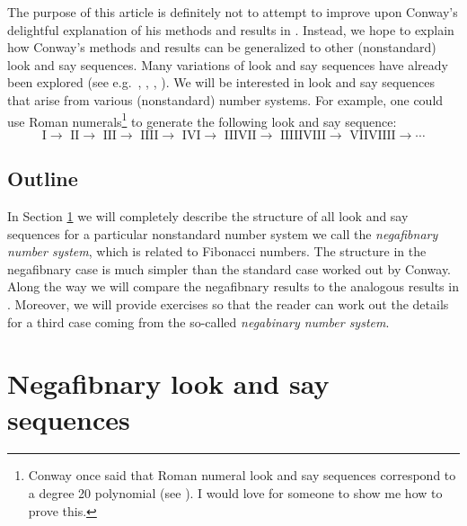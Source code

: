 \documentclass[reqno]{amsart}
\theoremstyle{definition}
\begin{document}
The purpose of this article is definitely not to attempt to improve upon Conway's delightful explanation of his methods and results in \cite{Conway}. Instead, we hope to explain how Conway's methods and results can be generalized to other (nonstandard) look and say sequences. Many variations of look and say sequences have already been explored (see e.g.~\cite{brier2020stuttering,brier2020lookandsay}, \cite{Matin}, \cite{Morrill}, \cite{SauerbergShu}). We will be interested in look and say sequences that arise from various (nonstandard) number systems. For example, one could use Roman numerals\footnote{Conway once said that Roman numeral look and say sequences correspond to a degree 20 polynomial (see \cite{Conway-numberphile}). I would love for someone to show me how to prove this.} 
to generate the following look and say sequence:
\begin{equation*}
    \text{I$\to$ II$\to$ III$\to$ IIII$\to$ IVI$\to$ IIIVII$\to$ IIIIIVIII$\to$ VIIVIIII}\to\cdots
\end{equation*}

\subsection{Outline} In Section \ref{section::negafibnary look and say} we will completely describe the structure of all look and say sequences for a particular nonstandard number system we call the \emph{negafibnary number system}, which is related to Fibonacci numbers. The structure in the negafibnary case is much simpler than the standard case worked out by Conway. Along the way we will compare the negafibnary results to the analogous results in \cite{Conway}. Moreover, we will provide exercises so that the reader can work out the details for a third case coming from the so-called \emph{negabinary number system}.




\section{Negafibnary look and say sequences}\label{section::negafibnary look and say}
\end{document}
